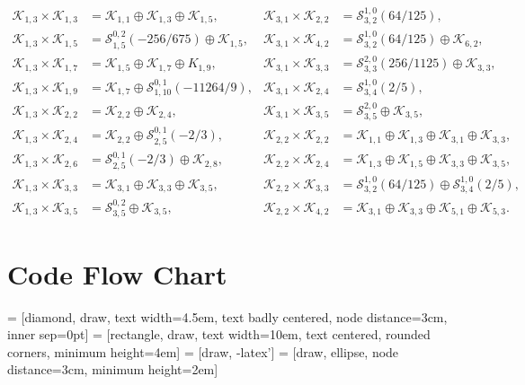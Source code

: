 \documentclass[a4paper,reqno,12pt]{report}
\theoremstyle{definition}
\numberwithin{equation}{section}
\newcommand{\Kac}[1]{\mathcal{K}_{#1}}       %
\newcommand{\Stag}[2]{\mathcal{S}_{#1}^{#2}} %
\newcommand{\fuse}{\mathbin{\times}}                                            %
\theoremstyle{plain}
\begin{document}
\begin{equation}
\begin{aligned}
  \Kac{1,3}\fuse \Kac{1,3} &= \Kac{1,1}\oplus \Kac{1,3}\oplus \Kac{1,5}, &
  \Kac{3,1}\fuse \Kac{2,2} &= \Stag{3,2}{1,0}(64/125), \\
  \Kac{1,3}\fuse \Kac{1,5} &= \Stag{1,5}{0,2}(-256/675)\oplus \Kac{1,5}, &
  \Kac{3,1}\fuse \Kac{4,2} &= \Stag{3,2}{1,0}(64/125) \oplus \Kac{6,2}, \\
  \Kac{1,3}\fuse \Kac{1,7} &= \Kac{1,5}\oplus \Kac{1,7} \oplus K_{1,9}, &
  \Kac{3,1}\fuse \Kac{3,3} &=  \Stag{3,3}{2,0}(256/1125)\oplus \Kac{3,3}, \\
  \Kac{1,3}\fuse \Kac{1,9} &= \Kac{1,7} \oplus \Stag{1,10}{0,1}(-11264/9), &
  \Kac{3,1}\fuse \Kac{2,4} &= \Stag{3,4}{1,0}(2/5), \\
  \Kac{1,3}\fuse \Kac{2,2} &= \Kac{2,2} \oplus \Kac{2,4}, &
  \Kac{3,1}\fuse \Kac{3,5} &= \Stag{3,5}{2,0} \oplus \Kac{3,5}, \\
  \Kac{1,3}\fuse \Kac{2,4} &= \Kac{2,2} \oplus \Stag{2,5}{0,1}(-2/3), &
  \Kac{2,2}\fuse \Kac{2,2} &= \Kac{1,1} \oplus \Kac{1,3} \oplus \Kac{3,1} \oplus \Kac{3,3}, \\
  \Kac{1,3}\fuse \Kac{2,6} &= \Stag{2,5}{0,1}(-2/3) \oplus \Kac{2,8}, &
  \Kac{2,2}\fuse \Kac{2,4} &= \Kac{1,3} \oplus \Kac{1,5} \oplus \Kac{3,3} \oplus \Kac{3,5}, \\
  \Kac{1,3}\fuse \Kac{3,3} &= \Kac{3,1} \oplus \Kac{3,3} \oplus \Kac{3,5}, &
  \Kac{2,2}\fuse \Kac{3,3} &=  \Stag{3,2}{1,0}(64/125) \oplus \Stag{3,4}{1,0}(2/5) , \\
  \Kac{1,3}\fuse \Kac{3,5} &= \Stag{3,5}{0,2} \oplus \Kac{3,5}, &
  \Kac{2,2}\fuse \Kac{4,2} &= \Kac{3,1} \oplus \Kac{3,3} \oplus \Kac{5,1} \oplus \Kac{5,3}.  
\end{aligned}
\end{equation}
 
\chapter{Code Flow Chart} \label{app:flowchart}

 = [diamond, draw,  
    text width=4.5em, text badly centered, node distance=3cm, inner sep=0pt]
 = [rectangle, draw, 
    text width=10em, text centered, rounded corners, minimum height=4em]
 = [draw, -latex']
 = [draw, ellipse, node distance=3cm,
    minimum height=2em]
\end{document}
